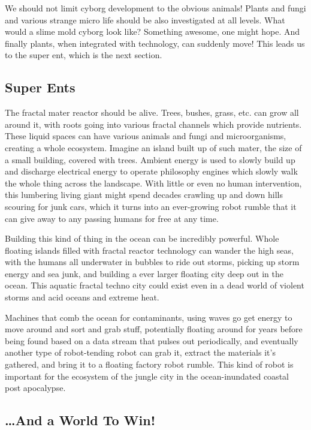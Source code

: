 \documentclass[11pt]{article}
\begin{document}
We should not limit cyborg development to the obvious animals! Plants
and fungi and various strange micro life should be also investigated at
all levels. What would a slime mold cyborg look like? Something awesome,
one might hope. And finally plants, when integrated with technology, can
suddenly move! This leads us to the super ent, which is the next
section.

\subsection{Super Ents}\label{super-ents}

The fractal mater reactor should be alive. Trees, bushes, grass, etc.
can grow all around it, with roots going into various fractal channels
which provide nutrients. These liquid spaces can have various animals
and fungi and microorganisms, creating a whole ecosystem. Imagine an
island built up of such mater, the size of a small building, covered
with trees. Ambient energy is used to slowly build up and discharge
electrical energy to operate philosophy engines which slowly walk the
whole thing across the landscape. With little or even no human
intervention, this lumbering living giant might spend decades crawling
up and down hills scouring for junk cars, which it turns into an
ever-growing robot rumble that it can give away to any passing humans
for free at any time.

Building this kind of thing in the ocean can be incredibly powerful.
Whole floating islands filled with fractal reactor technology can wander
the high seas, with the humans all underwater in bubbles to ride out
storms, picking up storm energy and sea junk, and building a ever larger
floating city deep out in the ocean. This aquatic fractal techno city
could exist even in a dead world of violent storms and acid oceans and
extreme heat.

Machines that comb the ocean for contaminants, using waves go get energy
to move around and sort and grab stuff, potentially floating around for
years before being found based on a data stream that pulses out
periodically, and eventually another type of robot-tending robot can
grab it, extract the materials it's gathered, and bring it to a floating
factory robot rumble. This kind of robot is important for the ecosystem
of the jungle city in the ocean-inundated coastal post apocalypse.

\subsection{\ldots{}And a World To Win!}\label{and-a-world-to-win}
\end{document}
